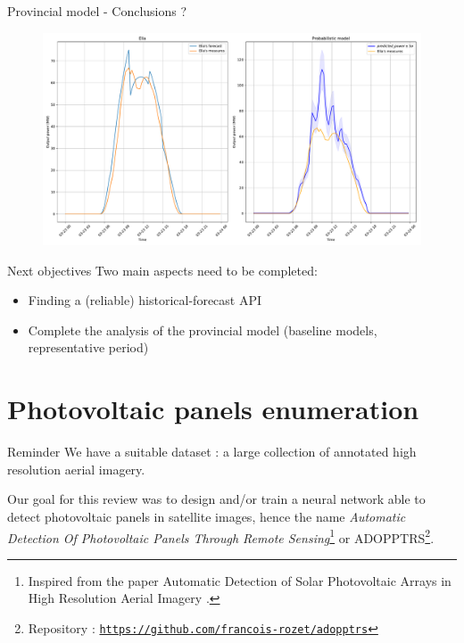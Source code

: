 \documentclass[12pt]{beamer}
\begin{document}
\begin{frame}{Provincial model - Conclusions ?}
    \begin{figure}
        \centering
        \includegraphics[width=.9\textwidth]{resources/pdf/bad_elia_post.pdf}
        \label{fig:bad_elia_post}
    \end{figure}
\end{frame}

\begin{frame}{Next objectives}
Two main aspects need to be completed:
\begin{itemize}
    \item Finding a (reliable) historical-forecast API
    \item Complete the analysis of the provincial model (baseline models, representative period)
\end{itemize}
\end{frame}
\section{Photovoltaic panels enumeration}

\begin{frame}{Reminder}
    We have a \alert{suitable dataset} : a large collection of annotated high resolution aerial imagery.
    
    Our goal for this review was to \alert{design and/or train} a neural network able to \alert{detect} photovoltaic panels in satellite images, hence the name \emph{Automatic Detection Of Photovoltaic Panels Through Remote Sensing}\footnote{Inspired from the paper \og{}Automatic Detection of Solar Photovoltaic Arrays in High Resolution Aerial Imagery\fg{} \cite{malof2016automatic}.} or \alert{ADOPPTRS}\footnote{Repository : \texttt{\href{https://github.com/francois-rozet/adopptrs}{https://github.com/francois-rozet/adopptrs}}}.
\end{frame}
\end{document}
